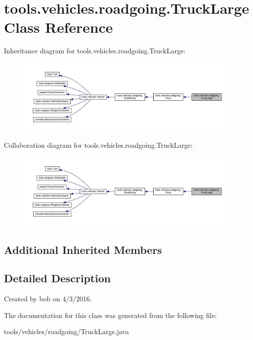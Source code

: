 \hypertarget{classtools_1_1vehicles_1_1roadgoing_1_1_truck_large}{}\section{tools.\+vehicles.\+roadgoing.\+Truck\+Large Class Reference}
\label{classtools_1_1vehicles_1_1roadgoing_1_1_truck_large}


Inheritance diagram for tools.\+vehicles.\+roadgoing.\+Truck\+Large\+:\nopagebreak
\begin{figure}[H]
\begin{center}
\leavevmode
\includegraphics[width=350pt]{classtools_1_1vehicles_1_1roadgoing_1_1_truck_large__inherit__graph}
\end{center}
\end{figure}


Collaboration diagram for tools.\+vehicles.\+roadgoing.\+Truck\+Large\+:\nopagebreak
\begin{figure}[H]
\begin{center}
\leavevmode
\includegraphics[width=350pt]{classtools_1_1vehicles_1_1roadgoing_1_1_truck_large__coll__graph}
\end{center}
\end{figure}
\subsection*{Additional Inherited Members}


\subsection{Detailed Description}
Created by bob on 4/3/2016. 

The documentation for this class was generated from the following file\+:\begin{DoxyCompactItemize}
\item 
tools/vehicles/roadgoing/Truck\+Large.\+java\end{DoxyCompactItemize}
